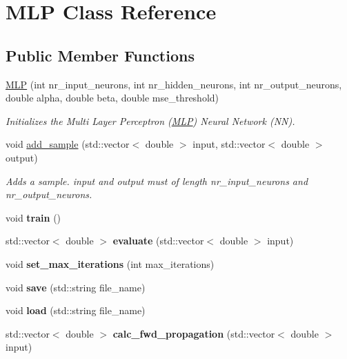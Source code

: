 \hypertarget{class_m_l_p}{}\section{M\+LP Class Reference}
\label{class_m_l_p}
\subsection*{Public Member Functions}
\begin{DoxyCompactItemize}
\item 
\hyperlink{class_m_l_p_aca912370e9368916ec0b0e4151fad953}{M\+LP} (int nr\+\_\+input\+\_\+neurons, int nr\+\_\+hidden\+\_\+neurons, int nr\+\_\+output\+\_\+neurons, double alpha, double beta, double mse\+\_\+threshold)
\begin{DoxyCompactList}\small\item\em Initializes the Multi Layer Perceptron (\hyperlink{class_m_l_p}{M\+LP}) Neural Network (NN). \end{DoxyCompactList}\item 
void \hyperlink{class_m_l_p_a359a9c2468149a6ccdefc44e0fd2e8f0}{add\+\_\+sample} (std\+::vector$<$ double $>$ input, std\+::vector$<$ double $>$ output)
\begin{DoxyCompactList}\small\item\em Adds a sample. input and output must of length nr\+\_\+input\+\_\+neurons and nr\+\_\+output\+\_\+neurons. \end{DoxyCompactList}\item 
void {\bfseries train} ()\hypertarget{class_m_l_p_a9c33bfaa168f0cba7e5051630ade0a30}{}\label{class_m_l_p_a9c33bfaa168f0cba7e5051630ade0a30}

\item 
std\+::vector$<$ double $>$ {\bfseries evaluate} (std\+::vector$<$ double $>$ input)\hypertarget{class_m_l_p_aaa026a420222ca8fc900b27b9f48770d}{}\label{class_m_l_p_aaa026a420222ca8fc900b27b9f48770d}

\item 
void {\bfseries set\+\_\+max\+\_\+iterations} (int max\+\_\+iterations)\hypertarget{class_m_l_p_a539b97a6901f47ce087971b3eee98513}{}\label{class_m_l_p_a539b97a6901f47ce087971b3eee98513}

\item 
void {\bfseries save} (std\+::string file\+\_\+name)\hypertarget{class_m_l_p_a9a186f70c578b832ba5141aa81d2fbe9}{}\label{class_m_l_p_a9a186f70c578b832ba5141aa81d2fbe9}

\item 
void {\bfseries load} (std\+::string file\+\_\+name)\hypertarget{class_m_l_p_a0ad12404dfd9c6e5907486d13cf8f199}{}\label{class_m_l_p_a0ad12404dfd9c6e5907486d13cf8f199}

\item 
std\+::vector$<$ double $>$ {\bfseries calc\+\_\+fwd\+\_\+propagation} (std\+::vector$<$ double $>$ input)\hypertarget{class_m_l_p_aa2386f601d59ec08f9acb779fa7b6dd7}{}\label{class_m_l_p_aa2386f601d59ec08f9acb779fa7b6dd7}

\end{DoxyCompactItemize}


